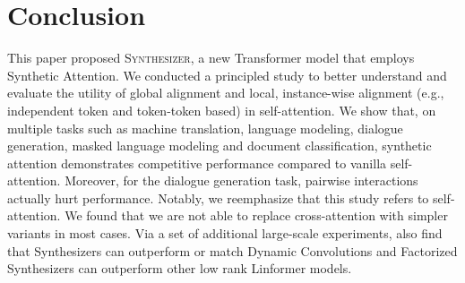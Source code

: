 \documentclass{article}
\begin{document}
\section{Conclusion}
This paper proposed \textsc{Synthesizer}, a new Transformer model that employs Synthetic Attention. We conducted a principled study to better understand and evaluate the utility of global alignment and local, instance-wise alignment (e.g., independent token and token-token based) in self-attention. We show that, on multiple tasks such as machine translation, language modeling, dialogue generation, masked language modeling and document classification, synthetic attention demonstrates competitive performance compared to vanilla self-attention. Moreover, for the dialogue generation task, pairwise interactions actually hurt performance. Notably, we reemphasize that this study refers to self-attention. We found that we are not able to replace cross-attention with simpler variants in most cases. Via a set of additional large-scale experiments, also find that Synthesizers can outperform or match Dynamic Convolutions and Factorized Synthesizers can outperform other low rank Linformer models.

\nocite{langley00}



\end{document}
